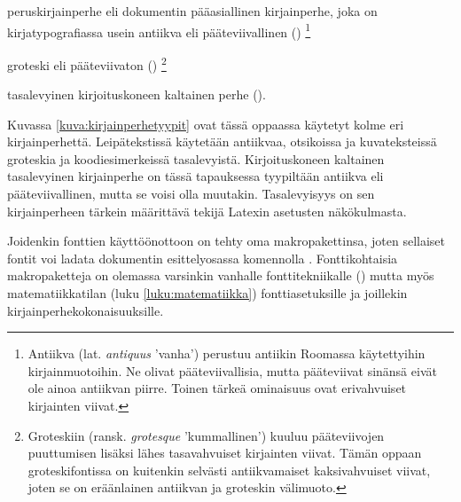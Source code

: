 \begin{nluetelma}

\item peruskirjainperhe eli dokumentin pääasiallinen kirjainperhe, joka
  on kirja\-typo\-gra\-fias\-sa usein antiikva eli pääteviivallinen
  ()%
  \footnote{Antiikva (lat. \emph{antiquus} 'vanha') perustuu antiikin
    Roomassa käytettyihin kirjainmuotoihin. Ne olivat pääteviivallisia,
    mutta pääteviivat sinänsä eivät ole ainoa antiikvan piirre. Toinen
    tärkeä ominaisuus ovat erivahvuiset kirjainten viivat.}

\item groteski eli pääteviivaton ()%
  \footnote{Groteskiin (ransk. \emph{grotesque} 'kummallinen') kuuluu
    pääteviivojen puuttumisen lisäksi lähes tasavahvuiset kirjainten
    viivat. Tämän oppaan groteskifontissa on kuitenkin selvästi
    antiikvamaiset kaksivahvuiset viivat, joten se on eräänlainen
    antiikvan ja groteskin välimuoto.}

\item tasalevyinen kirjoituskoneen kaltainen perhe
  ().

\end{nluetelma}

Kuvassa \ref{kuva:kirjainperhetyypit} ovat tässä oppaassa käytetyt kolme
eri kirjainperhettä. Leipätekstissä käytetään antiikvaa, otsikoissa ja
kuvateksteissä groteskia ja koodi\-esi\-mer\-keis\-sä tasalevyistä.
Kirjoituskoneen kaltainen tasalevyinen kirjainperhe on tässä tapauksessa
tyypiltään antiikva eli pääteviivallinen, mutta se voisi olla muutakin.
Tasalevyisyys on sen kirjainperheen tärkein määrittävä tekijä Latexin
asetusten näkökulmasta.


Joidenkin fonttien käyttöönottoon on tehty oma makropakettinsa, joten
sellaiset fontit voi ladata dokumentin esittelyosassa komennolla
. Fonttikohtaisia makropaketteja on olemassa
varsinkin vanhalle fonttitekniikalle () mutta myös matematiikkatilan (luku \ref{luku:matematiikka})
fonttiasetuksille ja joillekin kir\-jain\-perhe\-koko\-nai\-suuk\-sille.

